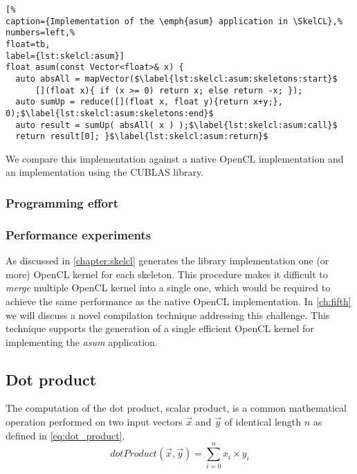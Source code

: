 \begin{lstlisting}[%                                                             
caption={Implementation of the \emph{asum} application in \SkelCL},%
numbers=left,%
float=tb,
label={lst:skelcl:asum}]
float asum(const Vector<float>& x) {
  auto absAll = mapVector($\label{lst:skelcl:asum:skeletons:start}$
      [](float x){ if (x >= 0) return x; else return -x; });
  auto sumUp = reduce([](float x, float y){return x+y;}, 0);$\label{lst:skelcl:asum:skeletons:end}$
  auto result = sumUp( absAll( x ) );$\label{lst:skelcl:asum:call}$
  return result[0]; }$\label{lst:skelcl:asum:return}$
\end{lstlisting}

We compare this implementation against a native OpenCL implementation and an implementation using the CUBLAS library.

\subsubsection*{Programming effort}

\subsubsection*{Performance experiments}

As discussed in \autoref{chapter:skelcl} generates the \SkelCL library implementation one (or more) OpenCL kernel for each skeleton.
This procedure makes it difficult to \emph{merge} multiple OpenCL kernel into a single one, which would be required to achieve the same performance as the native OpenCL implementation.
In \autoref{ch:fifth} we will discuss a novel compilation technique addressing this challenge.
This technique supports the generation of a single efficient OpenCL kernel for implementing the \emph{asum} application.

\subsection{Dot product}
\label{sec:dot}
The computation of the dot product, \aka scalar product, is a common mathematical operation performed on two input vectors $\vec{x}$ and $\vec{y}$ of identical length $n$ as defined in \autoref{eq:dot_product}.
\begin{equation}
  dotProduct(\vec{x}, \vec{y}) = \sum_{i=0}^{n} x_i \times y_i
  \label{eq:dot_product}
\end{equation}

